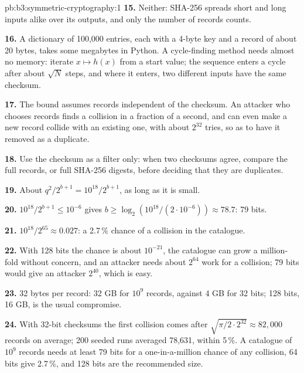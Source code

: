 \begin{solution}{pb:b3:symmetric-cryptography:1}
\textbf{15.} Neither: SHA-256 spreads short and long inputs alike over its outputs, and only the number of records counts.

\textbf{16.} A dictionary of 100,000 entries, each with a 4-byte key and a record of about 20 bytes, takes some megabytes in Python. A cycle-finding method needs almost no memory: iterate $x \mapsto h(x)$ from a start value; the sequence enters a cycle after about $\sqrt{N}$ steps, and where it enters, two different inputs have the same checksum.

\textbf{17.} The bound assumes records independent of the checksum. An attacker who chooses records finds a collision in a fraction of a second, and can even make a new record collide with an existing one, with about $2^{32}$ tries, so as to have it removed as a duplicate.

\textbf{18.} Use the checksum as a filter only: when two checksums agree, compare the full records, or full SHA-256 digests, before deciding that they are duplicates.

\textbf{19.} About $q^2 / 2^{b+1} = 10^{18} / 2^{b+1}$, as long as it is small.

\textbf{20.} $10^{18} / 2^{b+1} \le 10^{-6}$ gives $b \ge \log_2(10^{18} / (2 \cdot 10^{-6})) \approx 78.7$: 79 bits.

\textbf{21.} $10^{18} / 2^{65} \approx 0.027$: a 2.7\,\% chance of a collision in the catalogue.

\textbf{22.} With 128 bits the chance is about $10^{-21}$, the catalogue can grow a million-fold without concern, and an attacker needs about $2^{64}$ work for a collision; 79 bits would give an attacker $2^{40}$, which is easy.

\textbf{23.} 32 bytes per record: 32 GB for $10^9$ records, against 4 GB for 32 bits; 128 bits, 16 GB, is the usual compromise.

\textbf{24.} With 32-bit checksums the first collision comes after $\sqrt{\pi/2 \cdot 2^{32}} \approx 82{,}000$ records on average; 200 seeded runs averaged 78,631, within 5\,\%. A catalogue of $10^9$ records needs at least 79 bits for a one-in-a-million chance of any collision, 64 bits give 2.7\,\%, and 128 bits are the recommended size.
\end{solution}
